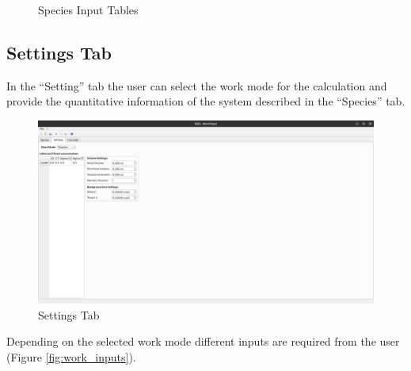 \documentclass[a4paper, 12pt]{article}
\begin{document}
\begin{figure}[h]
    \centering
    \qquad
    \caption{Species Input Tables}%
    \label{fig:species_tables}%
\end{figure}

\subsection{Settings Tab}
In the ``Setting'' tab  the user can select the work mode for the calculation and provide the quantitative information of the system described in the ``Species'' tab.

\begin{figure}[h]
	\centering
	\includegraphics[width=\textwidth]{img/settings.png}
	\caption{Settings Tab}
    \label{fig:settings}
\end{figure}

Depending on the selected work mode different inputs are required from the user (Figure \ref*{fig:work_inputs}).
\end{document}
